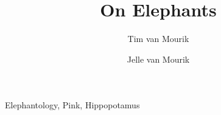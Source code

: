 \documentclass[preprint,authoryear]{../../Stylesheets/elsarticle/elsarticle}
\begin{document}
 



\begin{frontmatter}


\title{On Elephants}
\author[DccnAddres]{Tim van Mourik}
\author[YorkAddress,SonyAddress]{Jelle van Mourik}

\address[DccnAddres]{Donders Institute for Brain, Cognition and Behaviour, Radboud University Nijmegen, 6525 EN Nijmegen, The Netherlands}
\address[YorkAddress]{The Department of Electronics, The University of York, Heslington, York, North Yorkshire, YO10 5DD}
\address[SonyAddress]{Sony Computer Entertainment Europe, 10-15 Great Marlborough St, London W1F 7HR, United Kingdom}


\begin{keyword}

Elephantology, Pink, Hippopotamus
\end{keyword}

\end{frontmatter}




\newpage

\savethetrees

\savethetrees

\savethetrees

\savethetrees

\savethetrees

\savethetrees





\onecolumn

%


\end{document}
